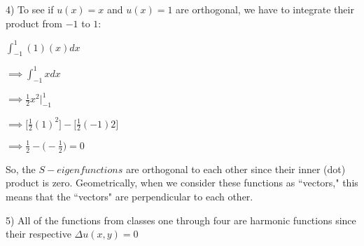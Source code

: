 \documentclass[executivepaper]{article}
\begin{document}
\begin{flushleft}

4) To see if $u(x)=x$ and $u(x)=1$ are orthogonal, we have to integrate their product from $-1$ to $1$:

\begin{center}

$\int_{-1}^{1} (1)(x) dx$

\vspace{1mm}

$\implies \int_{-1}^{1} x dx$

\vspace{1mm}

$\implies \frac{1}{2}x^2 \Big|_{-1}^{1}$

\vspace{1mm}

$\implies \bigg[\frac{1}{2}(1)^2\bigg]- \bigg[\frac{1}{2}(-1)2\bigg]$

\vspace{1mm}

$\implies \frac{1}{2}-\bigg(-\frac{1}{2}\bigg)=0$

\end{center}

\pagebreak

\vspace*{-40mm}

So, the $S-eigenfunctions$ are orthogonal to each other since their inner (dot) product is zero. Geometrically, when we consider these functions as ``vectors," this means that the ``vectors" are perpendicular to each other.

\end{flushleft}

\begin{flushleft}

5) All of the functions from classes one through four are harmonic functions since their respective $\Delta u(x,y)=0$

\end{flushleft}
\end{document}
